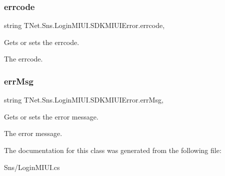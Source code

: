 \subsubsection{\texorpdfstring{errcode}{errcode}}
{\footnotesize\ttfamily string T\+Net.\+Sns.\+Login\+M\+I\+U\+I.\+S\+D\+K\+M\+I\+U\+I\+Error.\+errcode\hspace{0.3cm}{\ttfamily [get]}, {\ttfamily [set]}}



Gets or sets the errcode. 

The errcode.\mbox{\label{class_t_net_1_1_sns_1_1_login_m_i_u_i_1_1_s_d_k_m_i_u_i_error_a661b0cd49ea7ea351d12fc3e4febf756}} 
\subsubsection{\texorpdfstring{err\+Msg}{errMsg}}
{\footnotesize\ttfamily string T\+Net.\+Sns.\+Login\+M\+I\+U\+I.\+S\+D\+K\+M\+I\+U\+I\+Error.\+err\+Msg\hspace{0.3cm}{\ttfamily [get]}, {\ttfamily [set]}}



Gets or sets the error message. 

The error message.

The documentation for this class was generated from the following file\+:\begin{DoxyCompactItemize}
\item 
Sns/Login\+M\+I\+U\+I.\+cs\end{DoxyCompactItemize}
